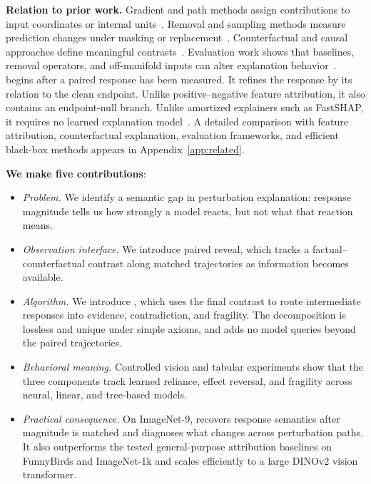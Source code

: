 \textbf{Relation to prior work.}
Gradient and path methods assign contributions to input coordinates or internal units~\citep{simonyan2014deep,selvaraju2017gradcam,sundararajan2017axiomatic,shrikumar2017deeplift,bach2015lrp}. Removal and sampling methods measure prediction changes under masking or replacement~\citep{fong2017meaningful,fong2019extremal,petsiuk2018rise,covert2021removing}. Counterfactual and causal approaches define meaningful contrasts~\citep{goyal2019counterfactual,chattopadhyay2019causal,janzing2020causal}. Evaluation work shows that baselines, removal operators, and off-manifold inputs can alter explanation behavior~\citep{adebayo2018sanity,hooker2019benchmark,rong2022consistent,jethani2023labelleakage}. \decaf begins after a paired response has been measured. It refines the response by its relation to the clean endpoint. Unlike positive--negative feature attribution, it also contains an endpoint-null branch. Unlike amortized explainers such as FastSHAP, it requires no learned explanation model~\citep{jethani2022fastshap}. A detailed comparison with feature attribution, counterfactual explanation, evaluation frameworks, and efficient black-box methods appears in Appendix~\ref{app:related}.

\textbf{We make five contributions}:
\begin{itemize}[leftmargin=1.4em,itemsep=1pt,topsep=0pt]
    \item \emph{Problem.}
    We identify a semantic gap in perturbation explanation: response magnitude tells us how strongly a model reacts, but not what that reaction means.

    \item \emph{Observation interface.}
    We introduce paired reveal, which tracks a factual--counterfactual contrast along matched trajectories as information becomes available.

    \item \emph{Algorithm.}
    We introduce \decaf, which uses the final contrast to route intermediate responses into evidence, contradiction, and fragility.
    The decomposition is lossless and unique under simple axioms, and adds no model queries beyond the paired trajectories.

    \item \emph{Behavioral meaning.}
    Controlled vision and tabular experiments show that the three components track learned reliance, effect reversal, and fragility across neural, linear, and tree-based models.

    \item \emph{Practical consequence.}
    On ImageNet-9, \decaf recovers response semantics after magnitude is matched and diagnoses what changes across perturbation paths.
    It also outperforms the tested general-purpose attribution baselines on FunnyBirds and ImageNet-1k and scales efficiently to a large DINOv2 vision transformer.

\end{itemize}